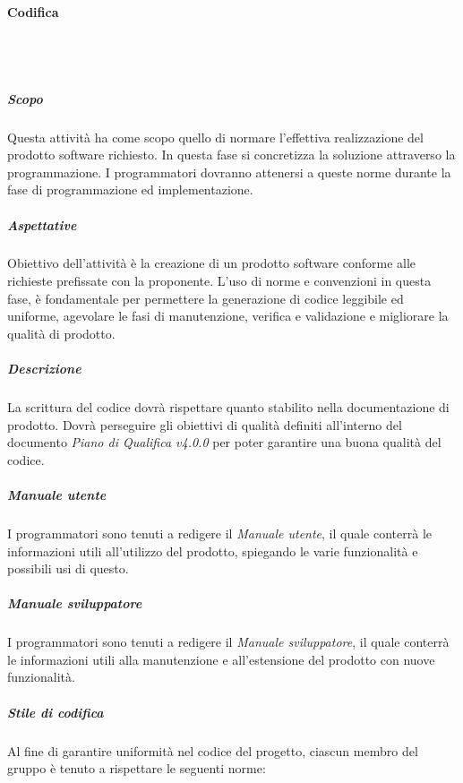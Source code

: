 		\paragraph{Codifica} \mbox{}\\ \mbox{}\\
			\subparagraph{Scopo} 
			Questa attività ha come scopo quello di normare l'effettiva realizzazione del prodotto software richiesto. In questa fase si concretizza la soluzione attraverso la programmazione. I programmatori dovranno attenersi a queste norme durante la fase di programmazione ed implementazione. \newline \newline
			\subparagraph{Aspettative} 
			Obiettivo dell'attività è la creazione di un prodotto software conforme alle richieste prefissate con la proponente.
			L'uso di norme e convenzioni in questa fase, è fondamentale per permettere la generazione di codice leggibile ed uniforme,  agevolare le fasi di manutenzione, verifica e validazione e migliorare la qualità di prodotto. \newline \newline
			\subparagraph{Descrizione}
			La scrittura del codice dovrà rispettare quanto stabilito nella documentazione di prodotto. Dovrà perseguire gli obiettivi di qualità definiti all'interno del documento \textit{Piano di Qualifica v4.0.0} per poter garantire una buona qualità del codice. \newline \newline
			\subparagraph{Manuale utente} 
			I programmatori sono tenuti a redigere il \textit{Manuale utente}, il quale conterrà le informazioni utili all'utilizzo del prodotto, spiegando le varie funzionalità e possibili usi di questo. \newline \newline
			\subparagraph{Manuale sviluppatore}
			I programmatori sono tenuti a redigere il \textit{Manuale sviluppatore}, il quale conterrà le informazioni utili alla manutenzione e all'estensione del prodotto con nuove funzionalità. \newline \newline
			\subparagraph{Stile di codifica} 
			Al fine di garantire uniformità nel codice del progetto, ciascun membro del gruppo è
			tenuto a rispettare le seguenti norme:
